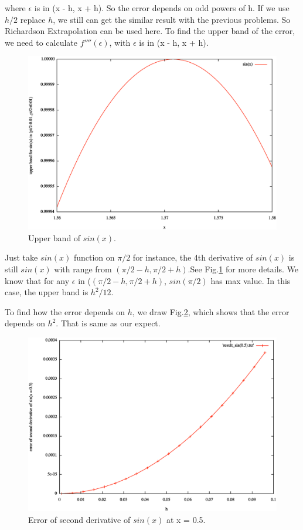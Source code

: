 \documentclass{article}
\begin{document}
where $\epsilon$ is in (x - h, x + h). So the error depends on odd powers of h. If we use $h/2$ replace $h$, we still can get the similar result with the previous
problems. So Richardson Extrapolation can be used here. To find the upper band of the error, we need to calculate $f''''(\epsilon)$, with $\epsilon$ is in (x - h, x + h).
\begin{figure}
    \centering
    \includegraphics[width=4.7in]{xx.eps}
    \caption{Upper band of $sin(x)$.}
    \label{xx}
\end{figure}
 Just take $sin(x)$ function on $\pi/2$ for instance, the 4th derivative of $sin(x)$ is still $sin(x)$ with range from $(\pi/2 - h, \pi/2 + h)$.See Fig.\ref{xx} for more details. We know that for any $\epsilon$ in ($(\pi/2 - h, \pi/2 + h)$, $sin(\pi/2)$ has max value. In this case, the upper band is $h^2/12$. 
 
 To find how the error depends on $h$, we draw Fig.\ref{2deriv}, which shows that the error depends on $h^2$. That is same as our expect. 
 \begin{figure}
    \centering
    \includegraphics[width=4.7in]{2deriv.eps}
    \caption{Error of second derivative of $sin(x)$ at x = 0.5.}
    \label{2deriv}
\end{figure}
\end{document}
